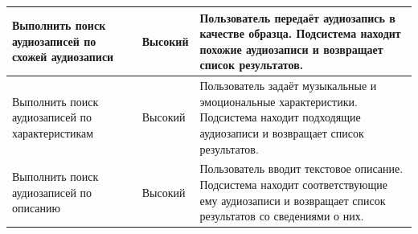 \begin{longtable}{|L{0.21\textwidth}|L{0.18\textwidth}|L{0.53\textwidth}|}
\hline
Выполнить поиск аудиозаписей по схожей аудиозаписи & Высокий & Пользователь передаёт аудиозапись в качестве образца. Подсистема находит похожие аудиозаписи и возвращает список результатов. \\
\hline
Выполнить поиск аудиозаписей по характеристикам & Высокий & Пользователь задаёт музыкальные и эмоциональные характеристики. Подсистема находит подходящие аудиозаписи и возвращает список результатов. \\
\hline
Выполнить поиск аудиозаписей по описанию & Высокий & Пользователь вводит текстовое описание. Подсистема находит соответствующие ему аудиозаписи и возвращает список результатов со сведениями о них. \\
\hline
\end{longtable}
\endgroup
